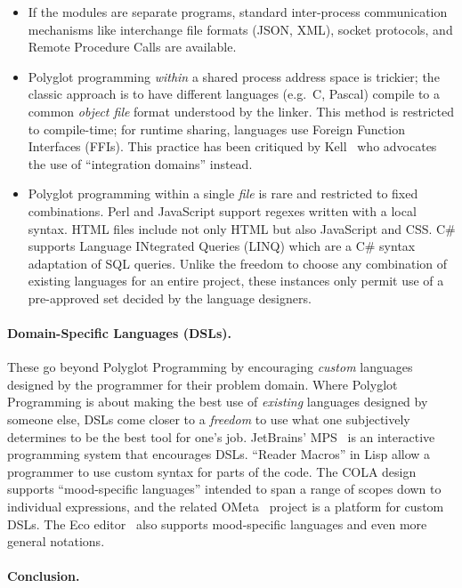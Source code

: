\begin{itemize}
\tightlist
\item
  If the modules are separate programs, standard inter-process
  communication mechanisms like interchange file formats (JSON, XML),
  socket protocols, and Remote Procedure Calls are available.
\item
  Polyglot programming \emph{within} a shared process address space is
  trickier; the classic approach is to have different languages (e.g.~C,
  Pascal) compile to a common \emph{object file} format understood by
  the linker. This method is restricted to compile-time; for runtime
  sharing, languages use Foreign Function Interfaces (FFIs). This
  practice has been critiqued by Kell~\cite{KellMMM} who advocates the
  use of ``integration domains'' instead.
\item
  Polyglot programming within a single \emph{file} is rare and
  restricted to fixed combinations. Perl and JavaScript support regexes
  written with a local syntax. HTML files include not only HTML but also
  JavaScript and CSS. C\# supports Language INtegrated Queries (LINQ)
  which are a C\# syntax adaptation of SQL queries. Unlike the freedom
  to choose any combination of existing languages for an entire project,
  these instances only permit use of a pre-approved set decided by the
  language designers.
\end{itemize}

\paragraph{Domain-Specific Languages (DSLs).}

These go beyond Polyglot Programming by encouraging \emph{custom}
languages designed by the programmer for their problem domain. Where
Polyglot Programming is about making the best use of \emph{existing}
languages designed by someone else, DSLs come closer to a \emph{freedom}
to use what one subjectively determines to be the best tool for one's
job. JetBrains' MPS~\cite{MPS} is an interactive programming system that
encourages DSLs. ``Reader Macros'' in Lisp allow a programmer to use
custom syntax for parts of the code. The COLA design~\cite{COLAs}
supports ``mood-specific languages'' intended to span a range of scopes
down to individual expressions, and the related OMeta~\cite{OMeta}
project is a platform for custom DSLs. The Eco editor~\cite{Eco} also
supports mood-specific languages and even more general notations.

\paragraph{Conclusion.}

